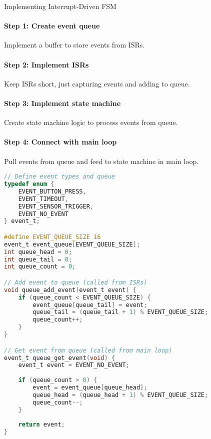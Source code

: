 \begin{KR}{Implementing Interrupt-Driven FSM}
\paragraph{Step 1: Create event queue}
Implement a buffer to store events from ISRs.
\paragraph{Step 2: Implement ISRs}
Keep ISRs short, just capturing events and adding to queue.
\paragraph{Step 3: Implement state machine}
Create state machine logic to process events from queue.
\paragraph{Step 4: Connect with main loop}
Pull events from queue and feed to state machine in main loop.

\begin{lstlisting}[language=C, style=basesmol]
// Define event types and queue
typedef enum {
    EVENT_BUTTON_PRESS,
    EVENT_TIMEOUT,
    EVENT_SENSOR_TRIGGER,
    EVENT_NO_EVENT
} event_t;

#define EVENT_QUEUE_SIZE 16
event_t event_queue[EVENT_QUEUE_SIZE];
int queue_head = 0;
int queue_tail = 0;
int queue_count = 0;

// Add event to queue (called from ISRs)
void queue_add_event(event_t event) {
    if (queue_count < EVENT_QUEUE_SIZE) {
        event_queue[queue_tail] = event;
        queue_tail = (queue_tail + 1) % EVENT_QUEUE_SIZE;
        queue_count++;
    }
}

// Get event from queue (called from main loop)
event_t queue_get_event(void) {
    event_t event = EVENT_NO_EVENT;
    
    if (queue_count > 0) {
        event = event_queue[queue_head];
        queue_head = (queue_head + 1) % EVENT_QUEUE_SIZE;
        queue_count--;
    }
    
    return event;
}

\end{lstlisting}
\end{KR}

